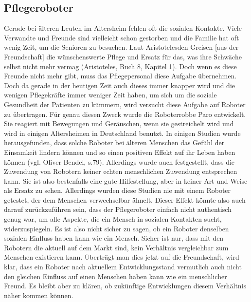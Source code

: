 \documentclass[12pt]{article}
\begin{document}
\subsection{Pflegeroboter}
Gerade bei älteren Leuten im Altersheim fehlen oft die sozialen Kontakte. Viele Verwandte und Freunde sind vielleicht schon gestorben und die Familie hat oft wenig Zeit, um die Senioren zu besuchen. Laut Aristoteles\glqq [erwächst] den Greisen [aus der Freundschaft] die wünschenswerte Pflege und Ersatz für das, was ihre Schwäche selbst nicht mehr vermag \grqq (Aristoteles, Buch 8, Kapitel 1). Doch wenn es diese Freunde nicht mehr gibt, muss das Pflegepersonal diese Aufgabe übernehmen. Doch da gerade in der heutigen Zeit auch dieses immer knapper wird und die wenigen Pflegekräfte immer weniger Zeit haben, um sich um die soziale Gesundheit der Patienten zu kümmern, wird versucht diese Aufgabe auf Roboter zu übertragen. Für genau diesen Zweck wurde die Roboterrobbe Paro entwickelt. Sie reagiert mit Bewegungen und Geräuschen, wenn sie gestreichelt wird und wird in einigen Altersheimen in Deutschland benutzt.\newline
In einigen Studien wurde herausgefunden, dass solche Roboter bei älteren Menschen das Gefühl der Einsamkeit lindern können und so einen positiven Effekt auf ihr Leben haben können (vgl. Oliver Bendel, s.79). Allerdings wurde auch festgestellt, dass die Zuwendung von Robotern keiner echten menschlichen Zuwendung entsprechen kann. Sie ist also bestenfalls eine gute Hilfestellung, aber in keiner Art und Weise als Ersatz zu sehen.\newline
Allerdings wurden diese Studien nie mit einem Roboter getestet, der dem Menschen verwechselbar ähnelt. Dieser Effekt könnte also auch darauf zurückzuführen sein, dass der Pflegeroboter einfach nicht authentisch genug war, um alle Aspekte, die ein Mensch in sozialen Kontakten sucht, widerzuspiegeln. Es ist also nicht sicher zu sagen, ob ein Roboter denselben sozialen Einfluss haben kann wie ein Mensch. Sicher ist nur, dass mit den Robotern die aktuell auf dem Markt sind, kein Verhältnis vergleichbar zum Menschen existieren kann.\newline
Überträgt man dies jetzt auf die Freundschaft, wird klar, dass ein Roboter nach aktuellem Entwicklungsstand vermutlich auch nicht den gleichen Einfluss auf einen Menschen haben kann wie ein menschlicher Freund. Es bleibt aber zu klären, ob zukünftige Entwicklungen diesem Verhältnis näher kommen können.
\end{document}

